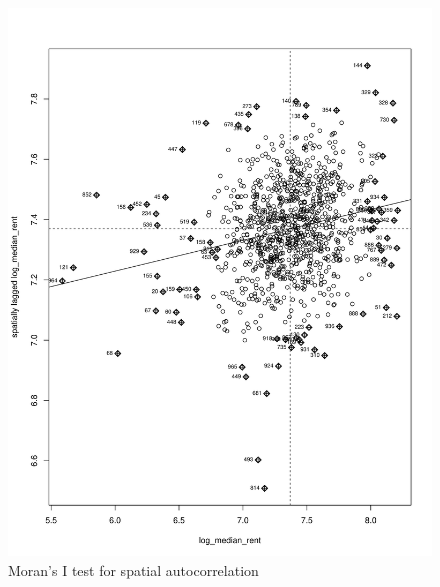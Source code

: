 \documentclass[10pt, letterpaper]{amsart}
\begin{document}
\begin{figure}[!htbp]
  \caption{Moran's I test for spatial autocorrelation}
  \includegraphics[scale=0.09]{Moran_active_rentals}
\end{figure}
\end{document}

